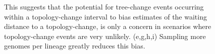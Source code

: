\documentclass[11pt]{article}
\begin{document}
\begin{figure}[p]
{{		%
		This suggests that the potential for tree-change events occurring within a 
		topology-change interval to bias estimates of the waiting distance to a
		topology-change, is only a concern in scenarios where topology-change events
		are very unlikely. (e,g,h,i) Sampling more genomes per lineage greatly 
		reduces this bias.
		}
	}
     \label{fig:figS-bias-topo-first}
\end{figure}
\end{document}
